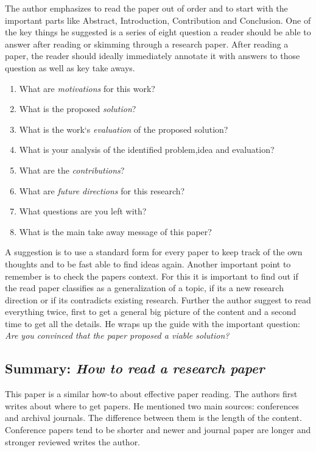 \documentclass{article}
\begin{document}
  The author emphasizes to read the paper out of order and to start with the important parts like Abstract, 
  Introduction, Contribution and Conclusion. One of the key things he suggested is a series of eight question 
  a reader should be able to answer after reading or skimming through a research paper. After reading a paper,
  the reader should ideally immediately annotate it with answers to those question as well as key take aways.
  \begin{enumerate}
    \item What are \emph{motivations} for this work?
    \item What is the proposed \emph{solution}?
    \item What is the work`s \emph{evaluation} of the proposed solution?
    \item What is your analysis of the identified problem,idea and evaluation?
    \item What are the \emph{contributions}?
    \item What are \emph{future directions} for this research? 
    \item What questions are you left with?
    \item What is the main take away message of  this paper?
  \end{enumerate}
A suggestion is to use a standard form for every paper to keep track of the own thoughts and to be fast able to 
find ideas again. Another important point to remember is to check the papers context.
For this it is important to find out if the read paper classifies as a generalization of a topic, if its a
new research direction or if its contradicts existing research.
Further the author suggest to read everything twice, first to get a general big picture of the content and a second
time to get all the details.
He wraps up the guide with the important question: \emph{Are you convinced that the paper proposed a viable solution?}

\subsection*{Summary: \emph{How to read a research paper}}

This paper \cite{Huang2000} is a similar how-to about effective paper reading.
The authors first writes about where to get papers. He mentioned two main sources: conferences and archival journals. The 
difference between them is the length of the content. Conference papers tend to be shorter and newer and journal paper are longer 
and stronger reviewed writes the author.
\end{document}
